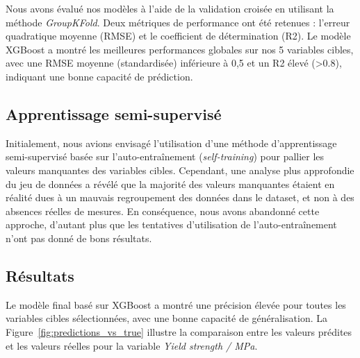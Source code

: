 \documentclass{article}
\begin{document}
Nous avons évalué nos modèles à l’aide de la validation croisée en utilisant la méthode \textit{GroupKFold}. Deux métriques de performance ont été retenues : l’erreur quadratique moyenne (RMSE) et le coefficient de détermination (R2). Le modèle XGBoost a montré les meilleures performances globales sur nos 5 variables cibles, avec une RMSE moyenne (standardisée) inférieure à 0,5 et un R2 élevé (>0.8), indiquant une bonne capacité de prédiction.

\subsection{Apprentissage semi-supervisé}

Initialement, nous avions envisagé l’utilisation d’une méthode d’apprentissage semi-supervisé basée sur l’auto-entraînement (\textit{self-training}) pour pallier les valeurs manquantes des variables cibles. Cependant, une analyse plus approfondie du jeu de données a révélé que la majorité des valeurs manquantes étaient en réalité dues à un mauvais regroupement des données dans le dataset, et non à des absences réelles de mesures. En conséquence, nous avons abandonné cette approche, d’autant plus que les tentatives d’utilisation de l’auto-entraînement n’ont pas donné de bons résultats.

\subsection{Résultats}

Le modèle final basé sur XGBoost a montré une précision élevée pour toutes les variables cibles sélectionnées, avec une bonne capacité de généralisation. La Figure~\ref{fig:predictions_vs_true} illustre la comparaison entre les valeurs prédites et les valeurs réelles pour la variable \textit{Yield strength / MPa}.
\end{document}

